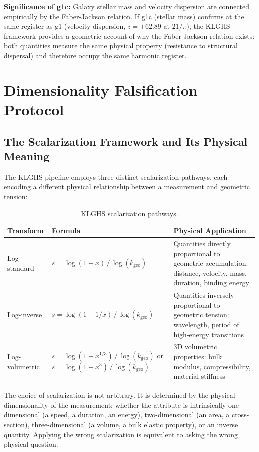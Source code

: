 \documentclass[12pt,a4paper]{article}
\newcommand{\kgeo}{\ensuremath{k_{\mathrm{geo}}}}
\begin{document}
\textbf{Significance of g1c:} Galaxy stellar mass and velocity dispersion are
connected empirically by the Faber-Jackson relation. If g1c (stellar mass)
confirms at the same register as g1 (velocity dispersion, $z = +62.89$ at
$21/\pi$), the KLGHS framework provides a geometric account of why the
Faber-Jackson relation exists: both quantities measure the same physical
property (resistance to structural dispersal) and therefore occupy the same
harmonic register.

\section{Dimensionality Falsification Protocol}
\label{sec:dim_falsification}

\subsection{The Scalarization Framework and Its Physical Meaning}

The KLGHS pipeline employs three distinct scalarization pathways, each encoding
a different physical relationship between a measurement and geometric tension:

\begin{table}[h!]
\centering
\caption{KLGHS scalarization pathways.}
\begin{tabular}{p{2.8cm} p{5.5cm} p{6cm}}
\toprule
\textbf{Transform} & \textbf{Formula} & \textbf{Physical Application} \\
\midrule
Log-standard & $s = \log(1+x)\,/\,\log(\kgeo)$ &
  Quantities directly proportional to geometric accumulation: distance, velocity,
  mass, duration, binding energy \\[0.5em]
Log-inverse & $s = \log(1+1/x)\,/\,\log(\kgeo)$ &
  Quantities inversely proportional to geometric tension: wavelength, period
  of high-energy transitions \\[0.5em]
Log-volumetric & $s = \log(1+x^{1/3})\,/\,\log(\kgeo)$ or
  $s = \log(1+x^3)\,/\,\log(\kgeo)$ &
  3D volumetric properties: bulk modulus, compressibility, material stiffness \\
\bottomrule
\end{tabular}
\end{table}

The choice of scalarization is not arbitrary. It is determined by the physical
dimensionality of the measurement: whether the attribute is intrinsically
one-dimensional (a speed, a duration, an energy), two-dimensional (an area,
a cross-section), three-dimensional (a volume, a bulk elastic property), or
an inverse quantity. Applying the wrong scalarization is equivalent to asking
the wrong physical question.
\end{document}

